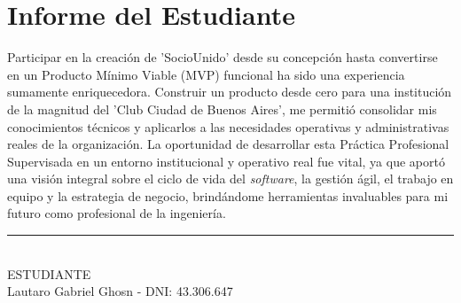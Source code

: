 \section{Informe del Estudiante}

Participar en la creación de 'SocioUnido' desde su concepción hasta convertirse en un Producto Mínimo Viable (MVP) funcional ha sido una experiencia sumamente enriquecedora. Construir un producto desde cero para una institución de la magnitud del 'Club Ciudad de Buenos Aires', me permitió consolidar mis conocimientos técnicos y aplicarlos a las necesidades operativas y administrativas reales de la organización. La oportunidad de desarrollar esta Práctica Profesional Supervisada en un entorno institucional y operativo real fue vital, ya que aportó una visión integral sobre el ciclo de vida del \textit{software}, la gestión ágil, el trabajo en equipo y la estrategia de negocio, brindándome herramientas invaluables para mi futuro como profesional de la ingeniería.

\vspace{1.5cm}
\noindent\rule{8cm}{0.4pt} \\
ESTUDIANTE \\
Lautaro Gabriel Ghosn - DNI: 43.306.647
